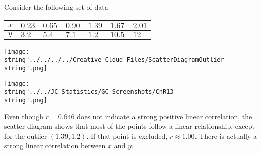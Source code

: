 \documentclass[11pt,a4paper]{book}
\begin{document}
Consider the following set of data
\begin{center}
\setlength{\extrarowheight}{2pt}%
\begin{tabular}{|>{\centering}p{1cm}|>{\centering}p{1cm}|>{\centering}p{1cm}|>{\centering}p{1cm}|>{\centering}p{1cm}|>{\centering}p{1cm}|>{\centering}p{1cm}|}
\hline
$x$ & $0.23$ & $0.65$ & $0.90$ & $1.39$ & $1.67$ & $2.01$\tabularnewline
\hline
$y$ & $3.2$ & $5.4$ & $7.1$ & $1.2$ & $10.5$ & $12$\tabularnewline
\hline
\end{tabular}
\par\end{center}

\begin{minipage}[t]{.5\textwidth}
\begin{center}
\texttt{[image: \\string"../../../../Creative Cloud Files/ScatterDiagramOutlier\\string".png]}
\par\end{center}

\end{minipage}
\begin{minipage}[t]{.5\textwidth}
\begin{center}
\texttt{[image: \\string"../../JC Statistics/GC Screenshots/CnR13\\string".png]}
\par\end{center}

Even though $r=0.646$ does not indicate a strong positive linear
correlation, the scatter diagram shows that most of the points follow
a linear relationship, except for the outlier $\left(1.39,1.2\right)$.
If that point is excluded, $r\approx1.00$. There is actually a strong
linear correlation between $x$ and $y$.

\end{minipage}

\newpage
\end{document}
